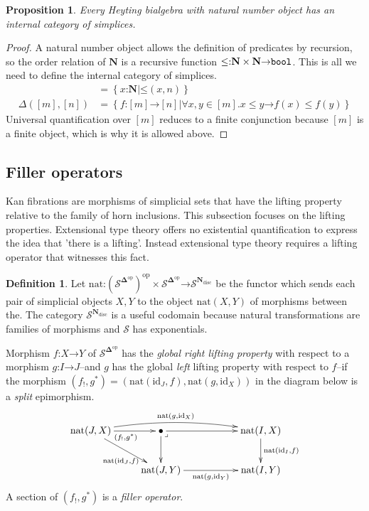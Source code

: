 \documentclass{amsart}
\theoremstyle{plain}
\newtheorem{prop}[theorem]{Proposition}
\theoremstyle{definition}
\newtheorem{defin}[theorem]{Definition}
\newcommand\cat\mathcal
\newcommand\set[1]{\left\{#1\right\}}
\newcommand\id{\mathrm{id}}
\newcommand\ri{^*}
\newcommand\nno{\mathbf N}
\newcommand\dual{^{\mathrm{op}}}
\newcommand\disc{_{\mathrm{disc}}}
\newcommand\simCat{\mathbf\Delta}
\newcommand\s{^{\simCat\dual}}
\newcommand\of{\mathord:}
\renewcommand\to{\mathord\rightarrow}
\begin{document}
\begin{prop} Every Heyting bialgebra with natural number object has an internal category of simplices.\end{prop}

\begin{proof} A natural number object allows the definition of predicates by recursion, so the order relation of $\nno$ is a recursive function $\mathord\leq\of\nno\times \nno \to \bool$. This is all we need to define the internal category of simplices.
\begin{align*}
[n] &= \set{x\of\nno| \mathord\leq(x,n)}\\
\Delta([m],[n]) &= \set{f\of[m]\to[n]|\forall x,y\in [m].x\leq y\to f(x)\leq f(y)}
\end{align*}
Universal quantification over $[m]$ reduces to a finite conjunction because $[m]$ is a finite object, which is why it is allowed above. 
\end{proof}

\subsection{Filler operators}
Kan fibrations are morphisms of simplicial sets that have the lifting property relative to the family of horn inclusions. This subsection focuses on the lifting properties. Extensional type theory offers no existential quantification to express the idea that 'there is a lifting'. Instead extensional type theory requires a lifting operator that witnesses this fact.

\newcommand\pb{\ar@{}[dr]|<\lrcorner}
\newcommand\po{\ar@{}[dr]|>\ulcorner}
\newcommand\nat{\mathrm{nat}}
\begin{defin} Let $\nat\of(\cat S\s)\dual\times \cat S\s \to \cat S^{\nno\disc}$ be the functor which sends each pair of simplicial objects $X,Y$ to the object $\nat(X,Y)$ of morphisms between the. The category $\cat S^{\nno\disc}$ is a useful codomain because natural transformations are families of morphisms and $\cat S$ has exponentials.

Morphism $f\of X\to Y$ of $\cat S\s$ has the \emph{global right lifting property} with respect to a morphism $g\of I\to J$--and $g$ has the global \emph{left} lifting property with respect to $f$--if the morphism $(f_!,g\ri) = (\nat(\id_J,f),\nat(g,\id_X))$ in the diagram below is a \emph{split} epimorphism.
\[\xymatrix{ 
\nat(J,X) \ar@/^2ex/[rrr]^{\nat(g,\id_X)} \ar[dr]_(.6){\nat(\id_J,f)} \ar[r]_{(f_!,g\ri)}
& \bullet \ar[d]\ar[rr]\pb && \nat(I,X) \ar[d]^{\nat(\id_I,f)}\\
& \nat(J,Y) \ar[rr]_{\nat(g,\id_Y)} && \nat(I,Y)
}\]
A section of $(f_!,g\ri)$ is a \emph{filler operator}.\label{lifting}
\end{defin}
\end{document}
